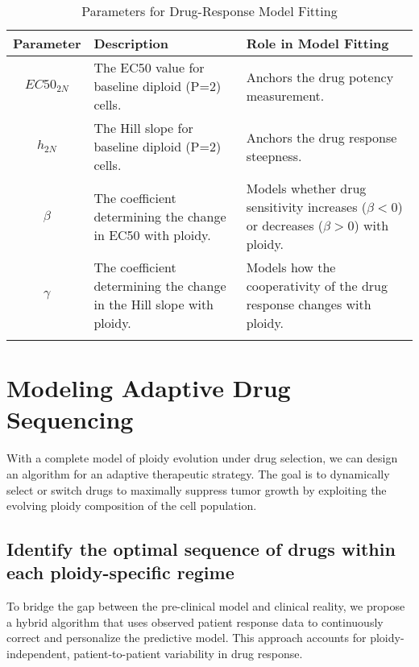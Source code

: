 \documentclass{article}
\begin{document}
\begin{table}[h!]
\centering
\caption{\color{blue} Parameters for Drug-Response Model Fitting \color{black}}
\label{tab:drug_parameters}
\begin{tabular}{|c|p{5cm}|p{6cm}|}
\hline
\textbf{Parameter} & \textbf{Description} & \textbf{Role in Model Fitting} \\
\hline
$EC50_{2N}$ & The EC50 value for baseline diploid (P=2) cells. & Anchors the drug potency measurement. \\
\hline
$h_{2N}$ & The Hill slope for baseline diploid (P=2) cells. & Anchors the drug response steepness. \\
\hline
$\beta$ & The coefficient determining the change in EC50 with ploidy. & Models whether drug sensitivity increases ($\beta < 0$) or decreases ($\beta > 0$) with ploidy. \\
\hline
$\gamma$ & The coefficient determining the change in the Hill slope with ploidy. & Models how the cooperativity of the drug response changes with ploidy. \\
\hline
\label{drugresponse}
\end{tabular}
\end{table}


\section{Modeling Adaptive Drug Sequencing}
With a complete model of ploidy evolution under drug selection, we can design an algorithm for an adaptive therapeutic strategy. The goal is to dynamically select or switch drugs to maximally suppress tumor growth by exploiting the evolving ploidy composition of the cell population.



  
\subsection{Identify the optimal sequence of drugs within each ploidy-specific regime}

To bridge the gap between the pre-clinical model and clinical reality, we propose a hybrid algorithm that uses observed patient response data to continuously correct and personalize the predictive model. This approach accounts for ploidy-independent, patient-to-patient variability in drug response.
\end{document}
